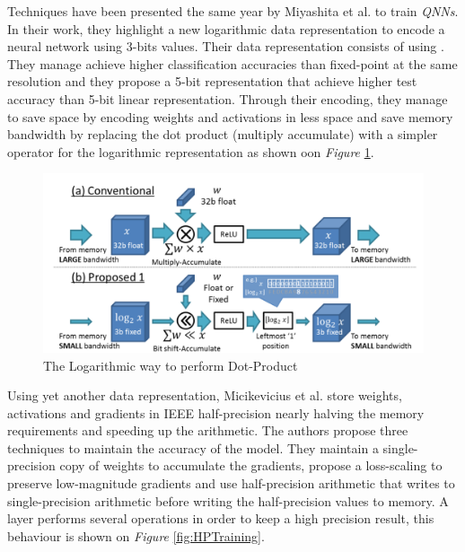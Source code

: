 Techniques have been presented the same year by Miyashita et al. \cite{Miyashita2016} to train \emph{QNNs}. In their work, they highlight a new logarithmic data representation to encode a neural network using 3-bits values. Their data representation consists of using . They manage achieve higher classification accuracies than fixed-point at the same resolution and they propose a 5-bit representation that achieve higher test accuracy than 5-bit linear representation. Through their encoding, they manage to save space by encoding weights and activations in less space and save memory bandwidth by replacing the dot product (multiply accumulate) with a simpler operator for the logarithmic representation as shown oon \emph{Figure} \ref{fig:DotProdLog}.

\begin{figure}[htbp]
	\centering
		\includegraphics[width=\textwidth]{Figures/DotProdLog.png}
	\caption[Logarithmic Dot Product]{The Logarithmic way to perform Dot-Product \cite{Miyashita2016}}
	\label{fig:DotProdLog}
\end{figure}

Using yet another data representation, Micikevicius et al. \cite{Micikevicius2017} store weights, activations and gradients in IEEE half-precision nearly halving the memory requirements and speeding up the arithmetic. The authors propose three techniques to maintain the accuracy of the model. They maintain a single-precision copy of weights to accumulate the gradients, propose a loss-scaling to preserve low-magnitude gradients and use half-precision arithmetic that writes to single-precision arithmetic before writing the half-precision values to memory. A layer performs several operations in order to keep a high precision result, this behaviour is shown on \emph{Figure} \ref{fig:HPTraining}.

